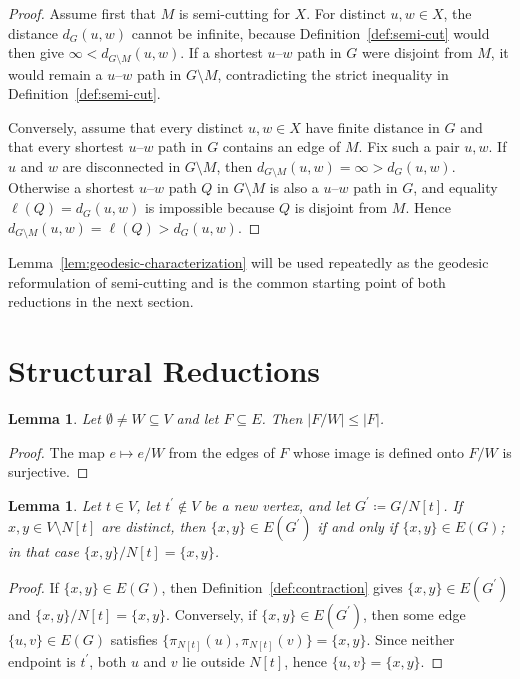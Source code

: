 \documentclass[11pt,a4paper]{amsart}
\theoremstyle{definition}
\theoremstyle{plain}
\newtheorem{lemma}[definition]{Lemma}
\newcommand{\len}[1]{\ell(#1)}
\newcommand{\dist}[3]{d_{#1}(#2,#3)}
\begin{document}
\begin{proof}
Assume first that $M$ is semi-cutting for $X$. For distinct $u,w\in X$, the distance $\dist{G}{u}{w}$ cannot be infinite, because Definition~\ref{def:semi-cut} would then give $\infty<\dist{G\setminus M}{u}{w}$. If a shortest $u$--$w$ path in $G$ were disjoint from $M$, it would remain a $u$--$w$ path in $G\setminus M$, contradicting the strict inequality in Definition~\ref{def:semi-cut}.

Conversely, assume that every distinct $u,w\in X$ have finite distance in $G$ and that every shortest $u$--$w$ path in $G$ contains an edge of $M$. Fix such a pair $u,w$. If $u$ and $w$ are disconnected in $G\setminus M$, then $\dist{G\setminus M}{u}{w}=\infty>\dist{G}{u}{w}$. Otherwise a shortest $u$--$w$ path $Q$ in $G\setminus M$ is also a $u$--$w$ path in $G$, and equality $\len{Q}=\dist{G}{u}{w}$ is impossible because $Q$ is disjoint from $M$. Hence $\dist{G\setminus M}{u}{w}=\len{Q}>\dist{G}{u}{w}$.
\end{proof}

Lemma~\ref{lem:geodesic-characterization} will be used repeatedly as the geodesic reformulation of semi-cutting and is the common starting point of both reductions in the next section.

\section{Structural Reductions}

\begin{lemma}\label{lem:contraction-image-size}
Let $\emptyset\neq W\subseteq V$ and let $F\subseteq E$. Then $|F/W|\le |F|$.
\end{lemma}

\begin{proof}
The map $e\mapsto e/W$ from the edges of $F$ whose image is defined onto $F/W$ is surjective.
\end{proof}

\begin{lemma}\label{lem:outside-edges}
Let $t\in V$, let $t^\prime\notin V$ be a new vertex, and let $G^\prime\coloneqq G/N[t]$. If $x,y\in V\setminus N[t]$ are distinct, then $\{x,y\}\in E(G^\prime)$ if and only if $\{x,y\}\in E(G)$; in that case $\{x,y\}/N[t]=\{x,y\}$.
\end{lemma}

\begin{proof}
If $\{x,y\}\in E(G)$, then Definition~\ref{def:contraction} gives $\{x,y\}\in E(G^\prime)$ and $\{x,y\}/N[t]=\{x,y\}$. Conversely, if $\{x,y\}\in E(G^\prime)$, then some edge $\{u,v\}\in E(G)$ satisfies $\{\pi_{N[t]}(u),\pi_{N[t]}(v)\}=\{x,y\}$. Since neither endpoint is $t^\prime$, both $u$ and $v$ lie outside $N[t]$, hence $\{u,v\}=\{x,y\}$.
\end{proof}
\end{document}
